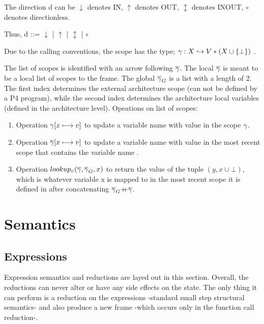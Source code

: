 \documentclass[UTF8]{article}
\begin{document}
The direction d can be $\downarrow$ denotes IN, $\uparrow$ denotes OUT, $\updownarrow$ denotes INOUT, $\circ$ denotes directionless. 

Thus,
d ::= $\downarrow$ | $\uparrow$ | $\updownarrow$ | $\circ$

Due to the calling conventions, the scope has the type; $ \gamma : X \hookrightarrow V * (X \cup \{ \bot \})  $ .

The list of scopes is identified with an arrow following $\overline{\gamma}$.
The local $\overline{\gamma}$ is meant to be a local list of scopes to the frame. The global $\overline{\gamma}_G$ is a list with a length of 2. The first index determines the external architecture scope (can not be defined by a P4 program), while the second index determines the architecture local variables (defined in the architecture level).
Opeations on list of scopes:
\begin{enumerate}
    \setlength{\itemsep}{1pt}
    \setlength{\parskip}{0pt}
    \setlength{\parsep}{0pt}
\item Operation $\gamma [x \longmapsto v]$ to update a variable name \vn{} with value \cval{} in the scope $\gamma$. 
\item Operation $\overline{\gamma} [x \longmapsto v]$ to update a variable name \vn{} with value \cval{} in the most recent scope that contains the variable name \vn{}.   
\item Operation $lookup_v(\overline{\gamma}, \overline{\gamma}_G, x)$ to return the value \cval{} of the tuple $(y, x \cup {\bot})$, which is whatever variable x is mapped to in the most recent scope it is defined in after concatenating $\overline{\gamma}_G {+}\mspace{-8mu}{+} \overline{\gamma}$. 
\end{enumerate}







\newpage

\section{Semantics}

\subsection{Expressions}\label{sec:expsem}
Expression semantics and reductions are layed out in this section. Overall, the reductions can never alter or have any side effects on the state. The only thing it can perform is a reduction on the expressions -standard small step structural semantics- and also produce a new frame -which occurs only in the function call reduction-.  
\end{document}
